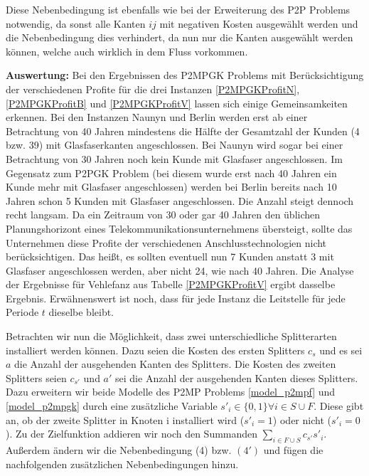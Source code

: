 \documentclass[11pt,a4paper]{article}
\theoremstyle{my_th_style1}
\begin{document}
Diese Nebenbedingung ist ebenfalls wie bei der Erweiterung des P2P Problems notwendig, da sonst alle Kanten $ij$ mit negativen Kosten ausgewählt werden und die Nebenbedingung dies verhindert, da nun nur die Kanten ausgew\"ahlt werden können, welche auch wirklich in dem Fluss vorkommen.
 
 \textbf{Auswertung:} Bei den Ergebnissen des P2MPGK Problems mit Ber\"ucksichtigung der verschiedenen Profite f\"ur die drei Instanzen \eqref{P2MPGKProfitN}, \eqref{P2MPGKProfitB} und \eqref{P2MPGKProfitV} lassen sich einige Gemeinsamkeiten erkennen.
 Bei den Instanzen Naunyn und Berlin werden erst ab einer Betrachtung von 40 Jahren mindestens die H\"alfte der Gesamtzahl der Kunden (4 bzw. 39) mit Glasfaserkanten angeschlossen.
 Bei Naunyn wird sogar bei einer Betrachtung von 30 Jahren noch kein Kunde mit Glasfaser angeschlossen.
 Im Gegensatz zum P2PGK Problem (bei diesem wurde erst nach 40 Jahren ein Kunde mehr mit Glasfaser angeschlossen) werden bei Berlin bereits nach 10 Jahren schon 5 Kunden mit Glasfaser angeschlossen. Die Anzahl steigt dennoch recht langsam. Da ein Zeitraum von 30 oder gar 40 Jahren den \"ublichen Planungshorizont eines Telekommunikationsunternehmens \"ubersteigt, sollte das Unternehmen diese Profite der verschiedenen Anschlusstechnologien nicht ber\"ucksichtigen.  Das heißt, es sollten eventuell nun 7 Kunden anstatt 3 mit Glasfaser angeschlossen werden, aber nicht 24, wie nach 40 Jahren.  Die Analyse der Ergebnisse für Vehlefanz aus Tabelle \ref{P2MPGKProfitV} ergibt dasselbe Ergebnis.
 Erwähnenswert ist noch, dass für jede Instanz die Leitstelle für jede Periode $t$ dieselbe bleibt.

 
Betrachten wir nun die Möglichkeit, dass zwei unterschiedliche Splitterarten installiert werden können.
Dazu seien die Kosten des ersten Splitters $c_s$ und es sei $a$ die Anzahl der ausgehenden Kanten des Splitters.
Die Kosten des zweiten Splitters seien $c_{s'}$ und $a'$ sei die Anzahl der ausgehenden Kanten dieses Splitters.
Dazu erweitern wir beide Modelle des P2MP Problems \ref{model_p2mpf} und \ref{model_p2mpgk} durch eine zusätzliche Variable $s'_i \in \{0,1\} \forall i \in S\cup F$.
Diese gibt an, ob der zweite Splitter in Knoten i installiert wird ($s'_i=1$) oder nicht ($s'_i=0$).
Zu der Zielfunktion addieren wir noch den Summanden $\displaystyle\sum_{i \in F \cup S} c_{s'} s'_i$.
Außerdem ändern wir die Nebenbedingung (4) bzw. $(4')$ und fügen die nachfolgenden zusätzlichen Nebenbedingungen hinzu.
\end{document}

